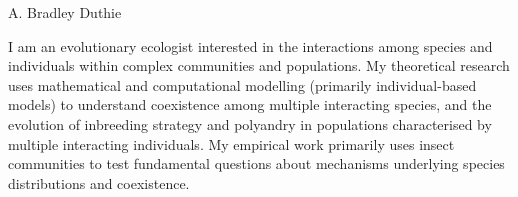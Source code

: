 \documentclass[letterpaper]{article}
\def\name{A. Bradley Duthie}
\begin{document}
\thispagestyle{specialfooter}


{\Huge \name}

\hrulefill

\vspace{0.03in}


I am an evolutionary ecologist interested in the interactions among species and individuals within complex communities and populations. My theoretical research uses mathematical and computational modelling (primarily individual-based models) to understand coexistence among multiple interacting species, and the evolution of inbreeding strategy and polyandry in populations characterised by multiple interacting individuals. My empirical work primarily uses insect communities to test fundamental questions about mechanisms underlying species distributions and coexistence. %



\hrulefill

\vspace{0.16in}

\end{document}
